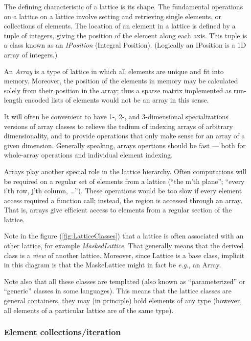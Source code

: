 The defining characteristic of a lattice is its shape. The fundamental
operations on a lattice on a lattice involve setting and retrieving
single elements, or collections of elements. The location of an
element in a lattice is defined by a tuple of integers, giving the
position of the element along each axis. This tuple is a class known
as an {\em IPosition} (Integral Position). (Logically an IPosition is
a 1D array of integers.)

An {\em Array} is a type of lattice in which all elements are unique and
fit into memory. Moreover, the position of the elements in memory may
be calculated solely from their position in the array; thus a sparse
matrix implemented as run-length encoded lists of elements would not
be an array in this sense. 

It will often be convenient to have 1-, 2-, and 3-dimensional
specializations versions of array classes to relieve the tedium of
indexing arrays of arbitrary dimensionality, and to provide operations
that only make sense for an array of a given dimension. Generally
speaking, arrays opertions should be fast --- both for whole-array
operations and individual element indexing.

Arrays play another special role in the lattice hierarchy. Often
computations will be required on a regular set of elements from a
lattice (``the m'th plane''; ``every i'th row, j'th column,
\ldots''). These operations would be too slow if every element access
required a function call; instead, the region is accessed through an
array. That is, arrays give efficient access to elements from a
regular section of the lattice.

Note in the figure (\ref{fig:LatticeClasses}) that a lattice is often
associated with an other lattice, for example {\em
MaskedLattice}. That generally means that the derived class is a {\em
view} of another lattice. Moreover, since Lattice is a base class,
implicit in this diagram is that the MaskeLattice might in fact be
{\em e.g.}, an Array.

Note also that all these classes are templated (also known as
``parameterized'' or ``generic'' classes in some languages). This
means that the lattice classes are general containers, they may (in
principle) hold elements of any type (however, all elements of a
particular lattice are of the same type).

\subsubsection{Element collections/iteration}

